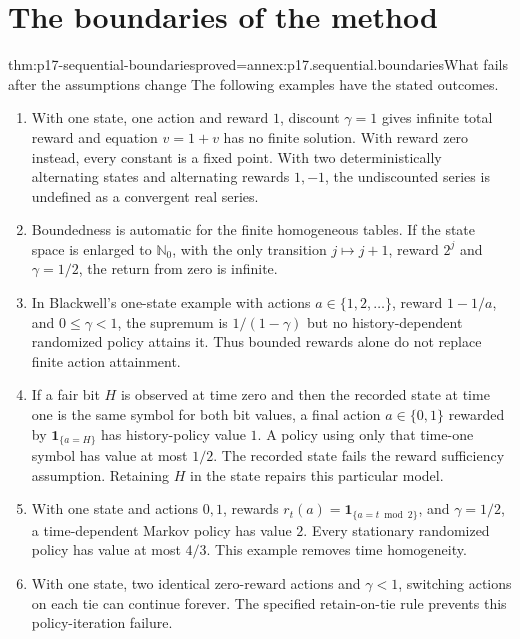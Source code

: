 \section{The boundaries of the method}

\begin{hbtheorem}{thm:p17-sequential-boundaries}{proved=annex:p17.sequential.boundaries}{What fails after the assumptions change}
The following examples have the stated outcomes.

\begin{enumerate}
\item With one state, one action and reward \(1\), discount
\(\gamma=1\) gives infinite total reward and equation \(v=1+v\)
has no finite solution. With reward zero instead, every
constant is a fixed point. With two deterministically alternating
states and alternating rewards \(1,-1\), the undiscounted
series is undefined as a convergent real series.
\item Boundedness is automatic for the finite homogeneous tables.
If the state space is enlarged to \(\mathbb N_0\), with the
only transition \(j\mapsto j+1\), reward \(2^j\) and
\(\gamma=1/2\), the return from zero is infinite.
\item In Blackwell's one-state example with actions
\(a\in\{1,2,\ldots\}\), reward \(1-1/a\), and
\(0\leq\gamma<1\), the supremum is \(1/(1-\gamma)\)
but no history-dependent randomized policy attains it.
Thus bounded rewards alone do not replace finite action attainment.
\item If a fair bit \(H\) is observed at time zero and then
the recorded state at time one is the same symbol for both
bit values, a final action \(a\in\{0,1\}\) rewarded by
\(\mathbf1_{\{a=H\}}\) has history-policy value \(1\).
A policy using only that time-one symbol has value at most
\(1/2\). The recorded state fails the reward sufficiency
assumption. Retaining \(H\) in the state repairs this particular model.
\item With one state and actions \(0,1\), rewards
\(r_t(a)=\mathbf1_{\{a=t\bmod2\}}\), and \(\gamma=1/2\),
a time-dependent Markov policy has value \(2\).
Every stationary randomized policy has value at most \(4/3\).
This example removes time homogeneity.
\item With one state, two identical zero-reward actions and
\(\gamma<1\), switching actions on each tie can continue forever.
The specified retain-on-tie rule prevents this policy-iteration failure.
\end{enumerate}
\end{hbtheorem}

